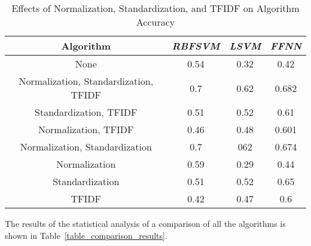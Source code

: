 \documentclass[conference]{IEEEtran}
\begin{document}
 \begin{table}[htbp]
 \caption{Effects of Normalization, Standardization, and TFIDF on Algorithm Accuracy}
 \begin{center}
 \begin{tabular}{|c|c|c|c|}
 \hline
 \cline{2-4} 
 \textbf{Algorithm} & \textbf{\textit{RBFSVM}} & \textbf{\textit{LSVM}} & \textbf{\textit{FFNN}} \\
 \hline
 None & 0.54 &  0.32 &  0.42 \\
 Normalization, Standardization, TFIDF & 0.7 &  0.62 &  0.682 \\
 Standardization, TFIDF & 0.51 &  0.52 &  0.61 \\
 Normalization, TFIDF & 0.46 &  0.48 &  0.601 \\
 Normalization, Standardization & 0.7 &  062 &  0.674 \\
 Normalization & 0.59 &  0.29 &  0.44 \\
 Standardization & 0.51 &  0.52 &  0.65 \\
 TFIDF & 0.42 &  0.47 &  0.6 \\
 \hline
 \end{tabular}
 \label{table_variations_comparison_results}
 \end{center}
 \end{table}


The results of the statistical analysis of a comparison of all the algorithms is shown in Table~\ref{table_comparison_results}. 
\end{document}
